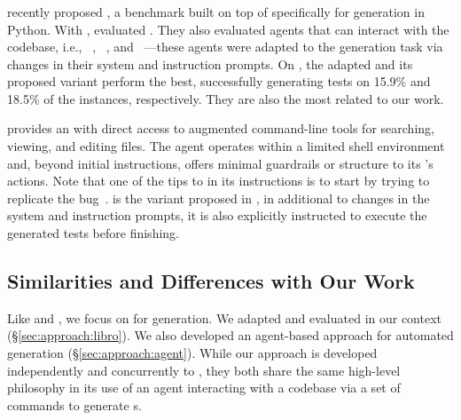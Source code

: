 \subsubsection{\sweagentplus}
\label{sec:relatedwork:brt:swtbench}

\citet{mundler2024swt} recently proposed \swtbench, a benchmark built on top of \swebench specifically for \brt generation in Python.
With \swtbench, \citet{mundler2024swt} evaluated \libro. 
They also evaluated \autopr agents that can interact with the codebase, i.e., \aider~\cite{aider}, \autocoderover~\cite{zhang2024autocoderover}, and \sweagent~\cite{yang2024swe}---these agents were adapted to the \brt generation task via changes in their system and instruction prompts.
On \swtbench, the adapted \sweagent and its proposed variant \sweagentplus perform the best, successfully generating \failtopass tests on 15.9\% and 18.5\% of the instances, respectively. 
They are also the most related to our work.


\sweagent provides an \llm with direct access to augmented command-line tools for searching, viewing, and editing files. 
The agent operates within a limited shell environment and, beyond initial instructions, offers minimal guardrails or structure to its \llm's actions.
Note that one of the tips to \sweagent in its instructions is to start by trying to replicate the bug~\cite{yang2024swe}.
\sweagentplus is the \sweagent variant proposed in \citet{mundler2024swt}, in additional to changes in the system and instruction prompts, it is also explicitly instructed to execute the generated tests before finishing.

\subsection{Similarities and Differences with Our Work}
\label{sec:relatedwork:compare}

Like \libro and \swtbench, we focus on \llm for \brt generation.
We adapted and evaluated \libro in our context (\S\ref{sec:approach:libro}).
We also developed an  agent-based approach for automated \brt generation (\S\ref{sec:approach:agent}).
While our approach is developed independently and concurrently to \sweagentplus, they both share the same high-level philosophy in its use of an \llm agent interacting with a codebase via a set of commands to generate \brt{}s.


